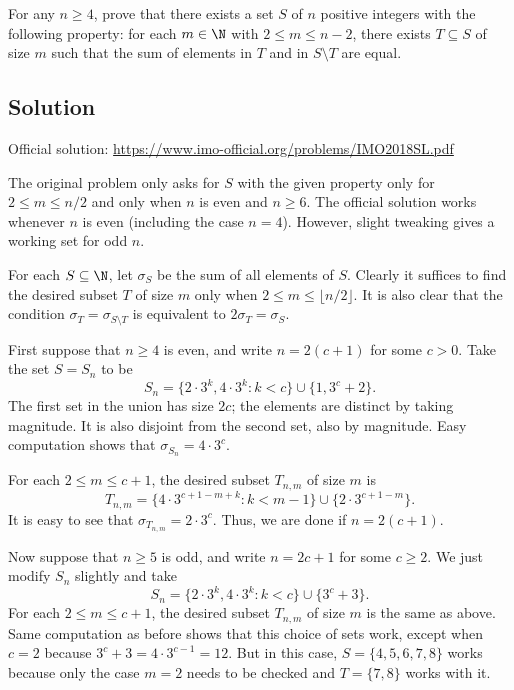 For any $n \geq 4$, prove that there exists a set $S$ of $n$ positive integers with the following property:
    for each $m \in \N$ with $2 \leq m \leq n - 2$, there exists $T \subseteq S$ of size $m$ such that the sum of elements in $T$ and in $S \setminus T$ are equal.



\subsection*{Solution}

Official solution: \url{https://www.imo-official.org/problems/IMO2018SL.pdf}

The original problem only asks for $S$ with the given property only for $2 \leq m \leq n/2$ and only when $n$ is even and $n \geq 6$.
The official solution works whenever $n$ is even (including the case $n = 4$).
However, slight tweaking gives a working set for odd $n$.

For each $S \subseteq \N$, let $\sigma_S$ be the sum of all elements of $S$.
Clearly it suffices to find the desired subset $T$ of size $m$ only when $2 \leq m \leq \lfloor n/2 \rfloor$.
It is also clear that the condition $\sigma_T = \sigma_{S \setminus T}$ is equivalent to $2 \sigma_T = \sigma_S$.

First suppose that $n \geq 4$ is even, and write $n = 2(c + 1)$ for some $c > 0$.
Take the set $S = S_n$ to be
\[ S_n = \{2 \cdot 3^k, 4 \cdot 3^k : k < c\} \cup \{1, 3^c + 2\}. \]
The first set in the union has size $2c$; the elements are distinct by taking magnitude.
It is also disjoint from the second set, also by magnitude.
Easy computation shows that $\sigma_{S_n} = 4 \cdot 3^c$.

For each $2 \leq m \leq c + 1$, the desired subset $T_{n, m}$ of size $m$ is
\[ T_{n, m} = \{4 \cdot 3^{c + 1 - m + k} : k < m - 1\} \cup \{2 \cdot 3^{c + 1 - m}\}. \]
It is easy to see that $\sigma_{T_{n, m}} = 2 \cdot 3^c$.
Thus, we are done if $n = 2(c + 1)$.

Now suppose that $n \geq 5$ is odd, and write $n = 2c + 1$ for some $c \geq 2$.
We just modify $S_n$ slightly and take
\[ S_n = \{2 \cdot 3^k, 4 \cdot 3^k : k < c\} \cup \{3^c + 3\}. \]
For each $2 \leq m \leq c + 1$, the desired subset $T_{n, m}$ of size $m$ is the same as above.
Same computation as before shows that this choice of sets work, except when $c = 2$ because $3^c + 3 = 4 \cdot 3^{c - 1} = 12$.
But in this case, $S = \{4, 5, 6, 7, 8\}$ works because only the case $m = 2$ needs to be checked and $T = \{7, 8\}$ works with it.
